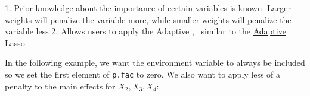 			1. Prior knowledge about the importance of certain variables is known. Larger weights will penalize the variable more, while smaller weights will penalize the variable less  
			2. Allows users to apply the Adaptive \sail, ~similar to the \href{http://users.stat.umn.edu/~zouxx019/Papers/adalasso.pdf}{Adaptive Lasso}  
			
			In the following example, we want the environment variable to always be included so we set the first element of \texttt{p.fac} to zero. We also want to apply less of a penalty to the main effects for $X_2, X_3, X_4$:
			
			\begin{knitrout}\scriptsize
			\color{fgcolor}\begin{kframe}
			\begin{alltt}
			 \hlkwb{<-} \hlstd{(}\hlstd{,} \hlstd{,} \hlstd{,} \hlstd{,} \hlstd{,} \hlstd{(}\hlstd{,} \hlopt{*}\hlopt{$} \hlopt{-} \hlstd{))}
		\end{alltt}
	\end{kframe}
\end{knitrout}


\begin{knitrout}\scriptsize
	\color{fgcolor}\begin{kframe}
		\begin{alltt}
			 \hlkwb{<-} \hlstd{(} \hlopt{$}  \hlopt{$}  \hlopt{$}  \hlstd{= f.basis,}
			 \hlstd{= p.fac)}
			\end{alltt}
			\end{kframe}
			\end{knitrout}
			
